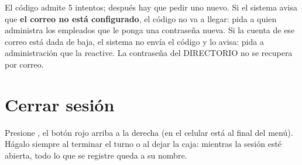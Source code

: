 \begin{importante}
El código admite 5 intentos; después hay que pedir uno nuevo. Si el sistema avisa que \textbf{el correo no está configurado}, el código no va a llegar: pida a quien administra los empleados que le ponga una contraseña nueva. Si la cuenta de ese correo está dada de baja, el sistema no envía el código y lo avisa: pida a administración que la reactive. La contraseña del DIRECTORIO no se recupera por correo.
\end{importante}

\section{Cerrar sesión}

Presione , el botón rojo arriba a la derecha (en el celular está al final del menú). Hágalo siempre al terminar el turno o al dejar la caja: mientras la sesión esté abierta, todo lo que se registre queda a su nombre.
